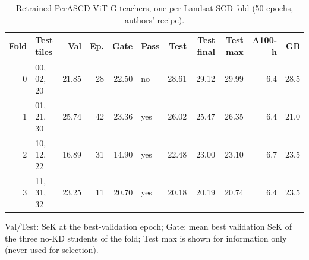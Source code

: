 \begin{table}[!t]
\centering
\footnotesize
\caption{Retrained PerASCD ViT-G teachers, one per Landsat-SCD fold (50 epochs, authors' recipe).}
\label{tab:s-teachers}
\begin{tabular}{rlrrrlrrrrr}
\toprule
Fold & Test tiles & Val & Ep. & Gate & Pass & Test & Test final & Test max & A100-h & GB \\
\midrule
0 & 00, 02, 20 & 21.85 & 28 & 22.50 & no & 28.61 & 29.12 & 29.99 & 6.4 & 28.5 \\
1 & 01, 21, 30 & 25.74 & 42 & 23.36 & yes & 26.02 & 25.47 & 26.35 & 6.4 & 21.0 \\
2 & 10, 12, 22 & 16.89 & 31 & 14.90 & yes & 22.48 & 23.00 & 23.10 & 6.7 & 23.5 \\
3 & 11, 31, 32 & 23.25 & 11 & 20.70 & yes & 20.18 & 20.19 & 20.74 & 6.4 & 23.5 \\
\bottomrule
\end{tabular}
\par\smallskip\parbox{\linewidth}{\scriptsize Val/Test: SeK at the best-validation epoch; Gate: mean best validation SeK of the three no-KD students of the fold; Test max is shown for information only (never used for selection).}
\end{table}
